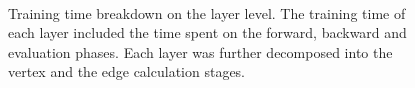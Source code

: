 \begin{figure}[H]
    \centering
    \\
    \caption{Training time breakdown on the layer level. The training time of each layer included the time spent on the forward, backward and evaluation phases. Each layer was further decomposed into the vertex and the edge calculation stages.}
    \label{fig:exp_vertex_edge_cal_proportion}
\end{figure}

